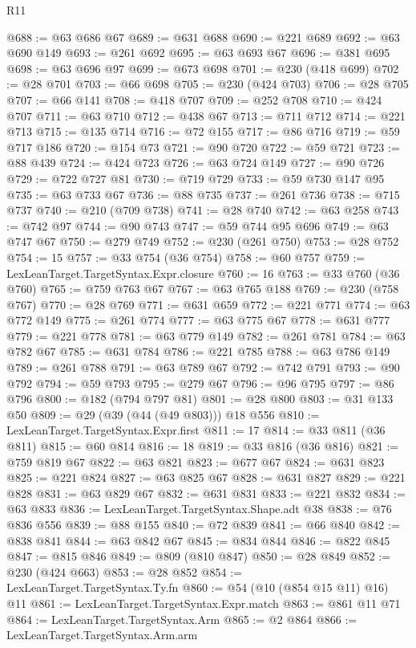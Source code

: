 \begin{lexlean}{R11}
\begin{coremodule}
@688 := @63 @686 @67
@689 := @631 @688
@690 := @221 @689
@692 := @63 @690 @149
@693 := @261 @692
@695 := @63 @693 @67
@696 := @381 @695
@698 := @63 @696 @97
@699 := @673 @698
@701 := @230 (@418 @699)
@702 := @28 @701
@703 := @66 @698
@705 := @230 (@424 @703)
@706 := @28 @705
@707 := @66 @141
@708 := @418 @707
@709 := @252 @708
@710 := @424 @707
@711 := @63 @710
@712 := @438 @67
@713 := @711 @712
@714 := @221 @713
@715 := @135 @714
@716 := @72 @155
@717 := @86 @716
@719 := @59 @717 @186
@720 := @154 @73
@721 := @90 @720
@722 := @59 @721
@723 := @88 @439
@724 := @424 @723
@726 := @63 @724 @149
@727 := @90 @726
@729 := @722 @727 @81
@730 := @719 @729
@733 := @59 @730 @147 @95
@735 := @63 @733 @67
@736 := @88 @735
@737 := @261 @736
@738 := @715 @737
@740 := @210 (@709 @738)
@741 := @28 @740
@742 := @63 @258
@743 := @742 @97
@744 := @90 @743
@747 := @59 @744 @95 @696
@749 := @63 @747 @67
@750 := @279 @749
@752 := @230 (@261 @750)
@753 := @28 @752
@754 := 15
@757 := @33 @754 (@36 @754)
@758 := @60 @757
@759 := LexLeanTarget.TargetSyntax.Expr.closure
@760 := 16
@763 := @33 @760 (@36 @760)
@765 := @759 @763 @67
@767 := @63 @765 @188
@769 := @230 (@758 @767)
@770 := @28 @769
@771 := @631 @659
@772 := @221 @771
@774 := @63 @772 @149
@775 := @261 @774
@777 := @63 @775 @67
@778 := @631 @777
@779 := @221 @778
@781 := @63 @779 @149
@782 := @261 @781
@784 := @63 @782 @67
@785 := @631 @784
@786 := @221 @785
@788 := @63 @786 @149
@789 := @261 @788
@791 := @63 @789 @67
@792 := @742 @791
@793 := @90 @792
@794 := @59 @793
@795 := @279 @67
@796 := @96 @795
@797 := @86 @796
@800 := @182 (@794 @797 @81)
@801 := @28 @800
@803 := @31 @133 @50
@809 := @29 (@39 (@44 (@49 @803))) @18 @556
@810 := LexLeanTarget.TargetSyntax.Expr.first
@811 := 17
@814 := @33 @811 (@36 @811)
@815 := @60 @814
@816 := 18
@819 := @33 @816 (@36 @816)
@821 := @759 @819 @67
@822 := @63 @821
@823 := @677 @67
@824 := @631 @823
@825 := @221 @824
@827 := @63 @825 @67
@828 := @631 @827
@829 := @221 @828
@831 := @63 @829 @67
@832 := @631 @831
@833 := @221 @832
@834 := @63 @833
@836 := LexLeanTarget.TargetSyntax.Shape.adt @38
@838 := @76 @836 @556
@839 := @88 @155
@840 := @72 @839
@841 := @66 @840
@842 := @838 @841
@844 := @63 @842 @67
@845 := @834 @844
@846 := @822 @845
@847 := @815 @846
@849 := @809 (@810 @847)
@850 := @28 @849
@852 := @230 (@424 @663)
@853 := @28 @852
@854 := LexLeanTarget.TargetSyntax.Ty.fn
@860 := @54 (@10 (@854 @15 @11) @16) @11
@861 := LexLeanTarget.TargetSyntax.Expr.match
@863 := @861 @11 @71
@864 := LexLeanTarget.TargetSyntax.Arm
@865 := @2 @864
@866 := LexLeanTarget.TargetSyntax.Arm.arm

\end{coremodule}
\end{lexlean}
